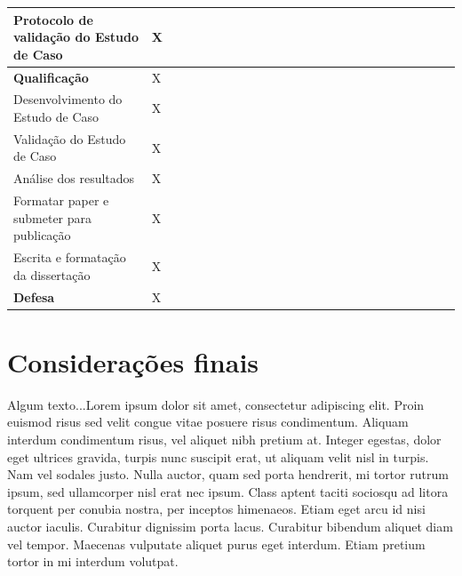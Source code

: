 \documentclass[quali]{mpit}
\begin{document}
\begin{table}[h]
\begin{tabular}{l | l | l | l | l | l | l | l | l | l | l | l | l | l | l | l | l | l | l | l | l | l | l | l | l }
Protocolo de validação do Estudo de Caso & X  &   &   &   &   &   &   &   &   &   &   &   &   &   &   &   &  &   &   &  &   \\ \hline

\textbf{Qualificação} & X  &   &   &   &   &   &   &   &   &   &   &   &   &   &   &   &  &   &   &  &   \\ \hline

Desenvolvimento do Estudo de Caso & X  &   &   &   &   &   &   &   &   &   &   &   &   &   &   &   &  &   &   &  &   \\ \hline

Validação do Estudo de Caso & X  &   &   &   &   &   &   &   &   &   &   &   &   &   &   &   &  &   &   &  &   \\ \hline

Análise dos resultados& X  &   &   &   &   &   &   &   &   &   &   &   &   &   &   &   &  &   &   &  &   \\ \hline

Formatar paper e submeter para publicação& X  &   &   &   &   &   &   &   &   &   &   &   &   &   &   &   &  &   &   &  &   \\ \hline

Escrita e formatação da dissertação & X  &   &   &   &   &   &   &   &   &   &   &   &   &   &   &   &  &   &   &  &   \\ \hline

\textbf{Defesa} & X  &   &   &   &   &   &   &   &   &   &   &   &   &   &   &   &  &   &   &  &   \\ \hline
\end{tabular}
\end{table}


\chapter{Considerações finais}

Algum texto...Lorem ipsum dolor sit amet, consectetur adipiscing elit. Proin euismod risus sed velit congue vitae posuere risus condimentum. Aliquam interdum condimentum risus, vel aliquet nibh pretium at. Integer egestas, dolor eget ultrices gravida, turpis nunc suscipit erat, ut aliquam velit nisl in turpis. Nam vel sodales justo. Nulla auctor, quam sed porta hendrerit, mi tortor rutrum ipsum, sed ullamcorper nisl erat nec ipsum. Class aptent taciti sociosqu ad litora torquent per conubia nostra, per inceptos himenaeos. Etiam eget arcu id nisi auctor iaculis. Curabitur dignissim porta lacus. Curabitur bibendum aliquet diam vel tempor. Maecenas vulputate aliquet purus eget interdum. Etiam pretium tortor in mi interdum volutpat.
\end{document}
